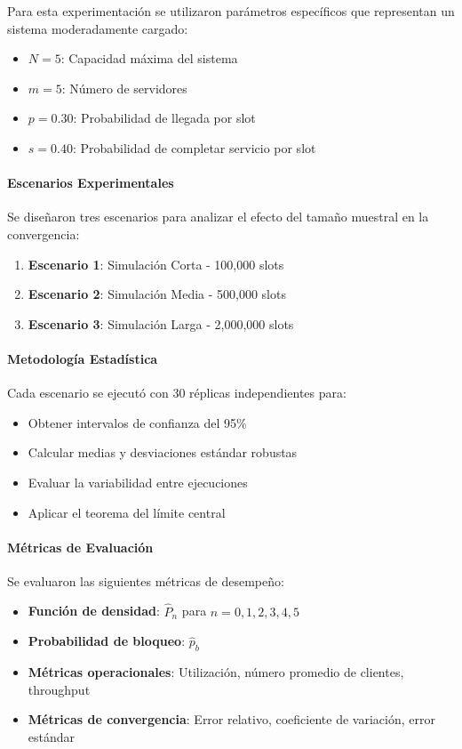 \documentclass{article}
\begin{document}
Para esta experimentación se utilizaron parámetros específicos que representan un sistema moderadamente cargado:
\begin{itemize}
    \item $N=5$: Capacidad máxima del sistema
    \item $m=5$: Número de servidores
    \item $p=0.30$: Probabilidad de llegada por slot
    \item $s=0.40$: Probabilidad de completar servicio por slot
\end{itemize}

\paragraph{Escenarios Experimentales}
Se diseñaron tres escenarios para analizar el efecto del tamaño muestral en la convergencia:
\begin{enumerate}
    \item \textbf{Escenario 1}: Simulación Corta - 100,000 slots
    \item \textbf{Escenario 2}: Simulación Media - 500,000 slots
    \item \textbf{Escenario 3}: Simulación Larga - 2,000,000 slots
\end{enumerate}

\paragraph{Metodología Estadística}
Cada escenario se ejecutó con 30 réplicas independientes para:
\begin{itemize}
    \item Obtener intervalos de confianza del 95\%
    \item Calcular medias y desviaciones estándar robustas
    \item Evaluar la variabilidad entre ejecuciones
    \item Aplicar el teorema del límite central
\end{itemize}

\paragraph{Métricas de Evaluación}
Se evaluaron las siguientes métricas de desempeño:
\begin{itemize}
    \item \textbf{Función de densidad}: $\hat{P}_n$ para $n = 0, 1, 2, 3, 4, 5$
    \item \textbf{Probabilidad de bloqueo}: $\hat{p}_b$
    \item \textbf{Métricas operacionales}: Utilización, número promedio de clientes, throughput
    \item \textbf{Métricas de convergencia}: Error relativo, coeficiente de variación, error estándar
\end{itemize}
\end{document}
